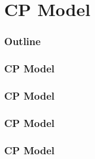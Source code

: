 \documentclass{beamer}
\newcommand{\AutoSectionTitle}{}
\begin{document}


\renewcommand{\AutoSectionTitle}{CP Model}

\section{\AutoSectionTitle}

\begin{frame}
  \frametitle{Outline}
  \tableofcontents[currentsection]
\end{frame}




\begin{frame}
  \frametitle{\AutoSectionTitle}
  
  \begin{center}
    
  \end{center}
  
\end{frame}




\begin{frame}
  \frametitle{\AutoSectionTitle}
  
  \begin{center}
    
  \end{center}
  
\end{frame}




\begin{frame}
  \frametitle{\AutoSectionTitle}
  
  \begin{center}
    
  \end{center}
  
\end{frame}




\begin{frame}
  \frametitle{\AutoSectionTitle}
  
  \begin{center}
    
  \end{center}
  
\end{frame}
\end{document}
